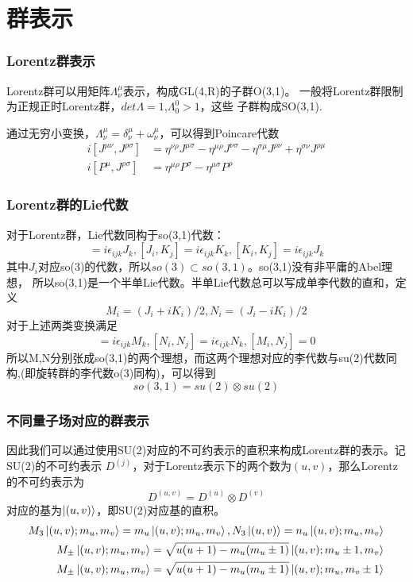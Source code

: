 \documentclass[aspectratio=1610,12pt]{beamer}
\begin{document}
\section{群表示}
\begin{frame}
    \frametitle{Lorentz群表示}
    Lorentz群可以用矩阵$\Lambda^\mu_\nu$表示，构成GL(4,R)的子群O(3,1)\cite{yucheng}\cite{Zee}。
    一般将Lorentz群限制为正规正时Lorentz群，$det\Lambda=1$,$\Lambda^0_0>1$，这些
    子群构成SO(3,1).

    通过无穷小变换\cite{weinberg}，$\Lambda^\mu_\nu=\delta^\mu_\nu+\omega^\mu_\nu$，可以得到Poincare代数
    \begin{align}
        i[J^{\mu\nu},J^{\rho\sigma}]&=\eta^{\nu\rho}J^{\mu\sigma}-\eta^{\mu\rho}J^{\nu\sigma}-\eta^{\sigma\mu}J^{\rho\nu}+\eta^{\sigma\nu}J^{\rho\mu}\\
        i[P^\mu,J^{\rho\sigma}]&=\eta^{\mu\rho}P^{\sigma}-\eta^{\mu\sigma}P^{\rho}
    \end{align}
\end{frame}
\begin{frame}
    \frametitle{Lorentz群的Lie代数}
    对于Lorentz群，Lie代数同构于so(3,1)代数：
    \begin{equation}
        [J_i,J_j]=i\epsilon_{ijk}J_k,[J_i,K_j]=i\epsilon_{ijk}K_k,[K_i,K_j]=i\epsilon_{ijk}J_k
    \end{equation}
    其中$J_i$对应so(3)的代数，所以$so(3)\subset so(3,1)$\cite{yucheng}。so(3,1)没有非平庸的Abel理想，
    所以so(3,1)是一个半单Lie代数。半单Lie代数总可以写成单李代数的直和，定义
    \begin{equation}
        M_i=(J_i+iK_i)/2, N_i=(J_i-iK_i)/2
    \end{equation}
    对于上述两类变换满足
    \begin{equation}
        [M_i,M_j]=i\epsilon_{ijk}M_k,[N_i,N_j]=i\epsilon_{ijk}N_k,[M_i,N_j]=0
    \end{equation}
    所以M,N分别张成so(3,1)的两个理想，而这两个理想对应的李代数与su(2)代数同构,(即旋转群的李代数o(3)同构)，可以得到
    \begin{equation}
        so(3,1)=su(2)\otimes su(2)
    \end{equation}
\end{frame}
\begin{frame}
    \frametitle{不同量子场对应的群表示}
    因此我们可以通过使用SU(2)对应的不可约表示的直积来构成Lorentz群的表示。记SU(2)的不可约表示
    $D^{(j)}$，对于Lorentz表示下的两个数为$(u,v)$，那么Lorentz的不可约表示为
    \begin{equation}
        D^{(u,v)}=D^{(u)}\otimes D^{(v)}
    \end{equation}
    对应的基为$\ket{(u,v)}$，即SU(2)对应基的直积。
    \begin{align}
        M_3 \ket{(u,v);m_u,m_v}=m_u\ket{(u,v);m_u,m_v}, N_3 \ket{(u,v)} =n_u \ket{(u,v);m_u,m_v}\\
        M_\pm \ket{(u,v);m_u,m_v} = \sqrt{u(u+1)-m_u(m_u\pm1)}\ket{(u,v);m_u\pm1,m_v}\\
        M_\pm \ket{(u,v);m_u,m_v} = \sqrt{u(u+1)-m_u(m_u\pm1)}\ket{(u,v);m_u,m_v\pm1}
    \end{align}
\end{frame}
\end{document}
